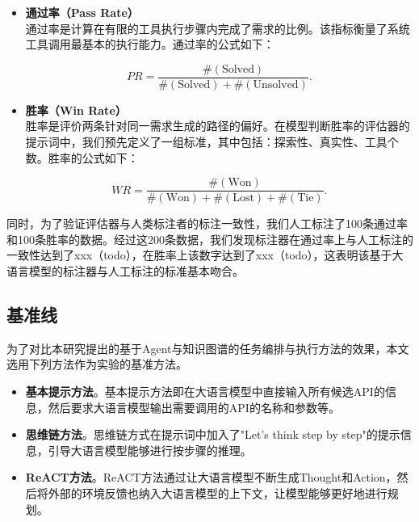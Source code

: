 \begin{itemize}
    \item \textbf{通过率（Pass Rate）} \\
    通过率是计算在有限的工具执行步骤内完成了需求的比例。该指标衡量了系统工具调用最基本的执行能力。通过率的公式如下：

    \begin{equation}
        PR = \frac{ \#(\text{Solved}) }{ \#(\text{Solved}) + \#(\text{Unsolved}) }.
    \end{equation}

    \item \textbf{胜率（Win Rate）} \\
    胜率是评价两条针对同一需求生成的路径的偏好。在模型判断胜率的评估器的提示词中，我们预先定义了一组标准，其中包括：探索性、真实性、工具个数。胜率的公式如下：

    \begin{equation}
        WR = \frac{ \#(\text{Won}) }{ \#(\text{Won}) + \#(\text{Lost}) + \#(\text{Tie}) }.
    \end{equation}

\end{itemize}

同时，为了验证评估器与人类标注者的标注一致性，我们人工标注了100条通过率和100条胜率的数据。经过这200条数据，我们发现标注器在通过率上与人工标注的一致性达到了xxx（todo），在胜率上该数字达到了xxx（todo），这表明该基于大语言模型的标注器与人工标注的标准基本吻合。

\subsection{基准线}

为了对比本研究提出的基于Agent与知识图谱的任务编排与执行方法的效果，本文选用下列方法作为实验的基准方法。

\begin{itemize}
  \item  \textbf{基本提示方法}。基本提示方法即在大语言模型中直接输入所有候选API的信息，然后要求大语言模型输出需要调用的API的名称和参数等。
  \item  \textbf{思维链方法}\cite{Wang2023}。思维链方式在提示词中加入了"Let's think step by step"的提示信息，引导大语言模型能够进行按步骤的推理。
  \item  \textbf{ReACT方法}\cite{Yao2023}。ReACT方法通过让大语言模型不断生成Thought和Action，然后将外部的环境反馈也纳入大语言模型的上下文，让模型能够更好地进行规划。
\end{itemize}
\indent

